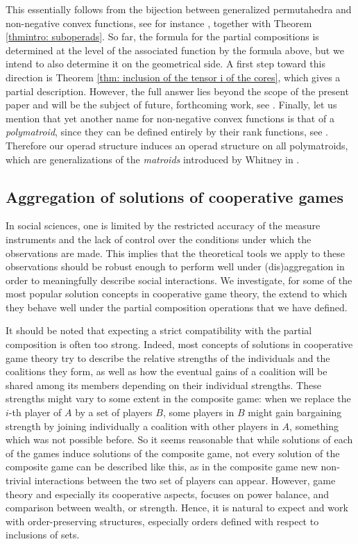 \documentclass[a4paper,12pt]{amsart}
\begin{document}
This essentially follows from the bijection between generalized permutahedra and non-negative convex functions, see for instance \cite[Section 12]{AguiarArdila}, together with Theorem \ref{thmintro: suboperads}. So far, the formula for the partial compositions is  determined at the level of the associated function by the formula above, but we intend to also determine it on the geometrical side. A first step toward this direction is Theorem \ref{thm: inclusion of the tensor i of the cores}, which gives a partial description. However, the full answer lies beyond the scope of the present paper and will be the subject of future, forthcoming work, see \cite{deuxiemepapier}. Finally, let us mention that yet another name for non-negative convex functions is that of a \textit{polymatroid}, since they can be defined entirely by their rank functions, see \cite[Definition 1.1]{Polymatroids}. Therefore our operad structure induces an operad structure on all polymatroids, which are generalizations of the \textit{matroids} introduced by Whitney in \cite{Whitney35}. 

\subsection*{Aggregation of solutions of cooperative games} In social sciences, one is limited by the restricted accuracy of the measure instruments and the lack of control over the conditions under which the observations are made. This implies that the theoretical tools we apply to these observations should be robust enough to perform well under (dis)aggregation in order to meaningfully describe social interactions. We investigate, for some of the most popular solution concepts in cooperative game theory, the extend to which they behave well under the partial composition operations that we have defined. 

\medskip

It should be noted that expecting a strict compatibility with the partial composition is often too strong. Indeed, most concepts of solutions in cooperative game theory try to describe the relative strengths of the individuals and the coalitions they form, as well as how the eventual gains of a coalition will be shared among its members  depending on their individual strengths. These strengths might vary to some extent in the composite game: when we replace the $i$-th player of $A$ by a set of players $B$, some players in $B$ might gain bargaining strength by joining individually a coalition with other players in $A$, something which was not possible before. So it seems reasonable that while solutions of each of the games induce solutions of the composite game, not every solution of the composite game can be described like this, as in the composite game new non-trivial interactions between the two set of players can appear. However, game theory and especially its cooperative aspects, focuses on power balance, and comparison between wealth, or strength. Hence, it is natural to expect and work with order-preserving structures, especially orders defined with respect to inclusions of sets. 
\end{document}
